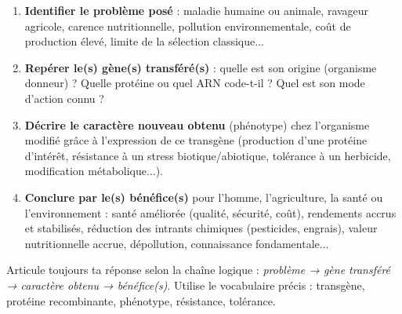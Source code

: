 \documentclass[11pt]{article}
\newcommand{\cle}[1]{{\popxbold\color{popdark}#1}}
\begin{document}
\begin{methode}
\begin{enumerate}
\item \textbf{Identifier le problème posé} : maladie humaine ou animale, ravageur agricole, carence nutritionnelle, pollution environnementale, coût de production élevé, limite de la sélection classique...
\item \textbf{Repérer le(s) gène(s) transféré(s)} : quelle est son origine (organisme donneur) ? Quelle protéine ou quel ARN code-t-il ? Quel est son mode d'action connu ?
\item \textbf{Décrire le caractère nouveau obtenu} (phénotype) chez l'organisme modifié grâce à l'expression de ce transgène (production d'une protéine d'intérêt, résistance à un stress biotique/abiotique, tolérance à un herbicide, modification métabolique...).
\item \textbf{Conclure par le(s) bénéfice(s)} pour l'homme, l'agriculture, la santé ou l'environnement : santé améliorée (qualité, sécurité, coût), rendements accrus et stabilisés, réduction des intrants chimiques (pesticides, engrais), valeur nutritionnelle accrue, dépollution, connaissance fondamentale...
\end{enumerate}
Articule toujours ta réponse selon la chaîne logique : \emph{problème → gène transféré → caractère obtenu → bénéfice(s)}. Utilise le vocabulaire précis : \cle{transgène}, \cle{protéine recombinante}, \cle{phénotype}, \cle{résistance}, \cle{tolérance}.
\end{methode}
\end{document}
